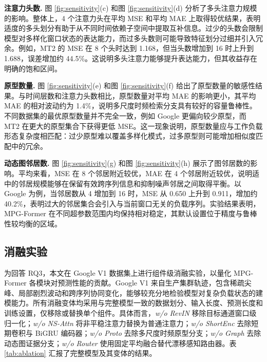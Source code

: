 \documentclass[UTF8]{ctexart}
\begin{document}
\textbf{注意力头数.} 图 \ref{fig:sensitivity}(c) 和图 \ref{fig:sensitivity}(d) 分析了多头注意力规模的影响。整体上，4 个注意力头在平均 MSE 和平均 MAE 上取得较优结果，表明适度的多头划分有助于从不同时间依赖子空间中提取互补信息。过少的头数会限制模型对多样化窗口状态的表达能力，而过多头数则可能导致特征划分过细并引入冗余。例如，MT2 的 MSE 在 8 个头时达到 1.168，但当头数增加到 16 时上升到 1.688，误差增加约 44.5\%。这说明多头注意力能够提升表达能力，但其收益存在明确的饱和区间。

\textbf{原型数量.} 图 \ref{fig:sensitivity}(e) 和图 \ref{fig:sensitivity}(f) 给出了原型数量的敏感性结果。与时间层数和注意力头数相比，原型数量对平均 MAE 的影响更小，其平均 MAE 的相对波动约为 1.4\%，说明多尺度时频检索分支具有较好的容量鲁棒性。不同数据集的最优原型数量并不完全一致，例如 Google 更偏向较少原型，而 MT2 在更大的原型集合下获得更低 MSE。这一现象说明，原型数量应与工作负载形态复杂度相匹配：过少原型难以覆盖多样化模式，过多原型则可能增加相似度匹配中的冗余。

\textbf{动态图邻居数.} 图 \ref{fig:sensitivity}(g) 和图 \ref{fig:sensitivity}(h) 展示了图邻居数的影响。平均来看，MSE 在 8 个邻居附近较优，MAE 在 4 个邻居附近较优，说明适中的邻居规模能够在保留有效跨序列信息和抑制噪声邻居之间取得平衡。以 Google 为例，当邻居数从 4 增加到 16 时，MSE 从 0.650 上升到 0.911，增加约 40.2\%，表明过大的邻居集合会引入与当前窗口无关的负载序列。实验结果表明，MPG-Former 在不同超参数范围内均保持相对稳定，其默认设置位于精度与鲁棒性较均衡的区域。

\newpage

\subsection{消融实验}

为回答 RQ3，本文在 Google V1 数据集上进行组件级消融实验，以量化 MPG-Former 各模块对预测性能的贡献。Google V1 来自生产集群轨迹，包含稀疏尖峰、局部剧烈波动和跨序列协同变化，能够较充分地检验模型对复杂负载状态的建模能力。所有消融变体均采用与完整模型一致的数据划分、输入长度、预测长度和训练设置，仅移除或替换单个组件。具体而言，\textit{w/o RevIN} 移除目标通道窗口级归一化；\textit{w/o NS-Attn} 将非平稳注意力替换为普通注意力；\textit{w/o ShortEnc} 去除短期卷积与 BiGRU 编码器；\textit{w/o Proto} 去除多尺度时频原型分支；\textit{w/o Graph} 去除动态图证据分支；\textit{w/o Router} 使用固定平均融合替代漂移感知路由器。表 \ref{tab:ablation} 汇报了完整模型及其变体的结果。
\end{document}

